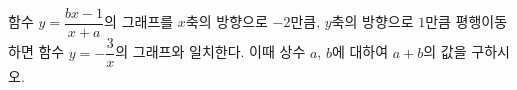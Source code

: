 \hspace*{2mm}\begin{minipage}[t]{\dimexpr\linewidth-2mm\relax}\vspace{0pt}
함수 $y=\dfrac{bx-1}{x+a}$의 그래프를 $x$축의 방향으로 $-2$만큼, $y$축의 방향으로 $1$만큼 평행이동하면 함수 $y=-\dfrac{3}{x}$의 그래프와 일치한다. 이때 상수 $a$, $b$에 대하여 $a+b$의 값을 구하시오.\end{minipage}
